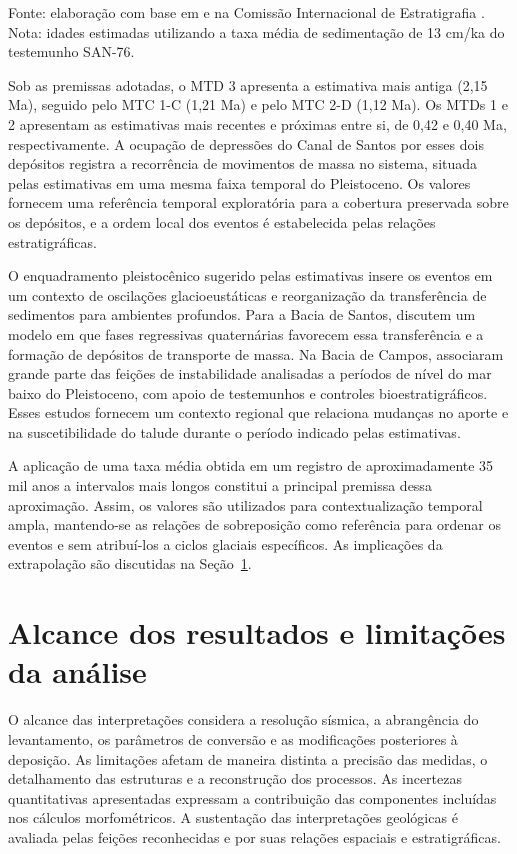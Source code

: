 Fonte: elaboração com base em  e na Comissão Internacional de Estratigrafia \cite{ics2026}. Nota: idades estimadas utilizando a taxa média de sedimentação de 13 cm/ka do testemunho SAN-76.

Sob as premissas adotadas, o MTD 3 apresenta a estimativa mais antiga (2,15 Ma), seguido pelo MTC 1-C (1,21 Ma) e pelo MTC 2-D (1,12 Ma). Os MTDs 1 e 2 apresentam as estimativas mais recentes e próximas entre si, de 0,42 e 0,40 Ma, respectivamente. A ocupação de depressões do Canal de Santos por esses dois depósitos registra a recorrência de movimentos de massa no sistema, situada pelas estimativas em uma mesma faixa temporal do Pleistoceno. Os valores fornecem uma referência temporal exploratória para a cobertura preservada sobre os depósitos, e a ordem local dos eventos é estabelecida pelas relações estratigráficas.

O enquadramento pleistocênico sugerido pelas estimativas insere os eventos em um contexto de oscilações glacioeustáticas e reorganização da transferência de sedimentos para ambientes profundos. Para a Bacia de Santos,  discutem um modelo em que fases regressivas quaternárias favorecem essa transferência e a formação de depósitos de transporte de massa. Na Bacia de Campos,  associaram grande parte das feições de instabilidade analisadas a períodos de nível do mar baixo do Pleistoceno, com apoio de testemunhos e controles bioestratigráficos. Esses estudos fornecem um contexto regional que relaciona mudanças no aporte e na suscetibilidade do talude durante o período indicado pelas estimativas.

A aplicação de uma taxa média obtida em um registro de aproximadamente 35 mil anos a intervalos mais longos constitui a principal premissa dessa aproximação. Assim, os valores são utilizados para contextualização temporal ampla, mantendo-se as relações de sobreposição como referência para ordenar os eventos e sem atribuí-los a ciclos glaciais específicos. As implicações da extrapolação são discutidas na Seção~\ref{sec:6-10}.

\section{Alcance dos resultados e limitações da análise}\label{sec:6-10}

O alcance das interpretações considera a resolução sísmica, a abrangência do levantamento, os parâmetros de conversão e as modificações posteriores à deposição. As limitações afetam de maneira distinta a precisão das medidas, o detalhamento das estruturas e a reconstrução dos processos. As incertezas quantitativas apresentadas expressam a contribuição das componentes incluídas nos cálculos morfométricos. A sustentação das interpretações geológicas é avaliada pelas feições reconhecidas e por suas relações espaciais e estratigráficas.

